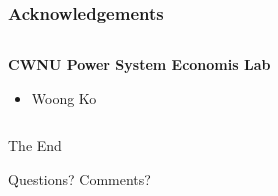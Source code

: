 \documentclass[
	11pt, %
	aspectratio=169, %
]{beamer}
\begin{document}
\begin{frame}
	\frametitle{Acknowledgements}
	
	\begin{columns}[t] %
		\begin{column}{0.45\textwidth} %
			\textbf{CWNU Power System Economis Lab}
			\begin{itemize}
				\item Woong Ko
			\end{itemize}
			
		\end{column}		
		
	\end{columns}
\end{frame}


\begin{frame}[plain] %
	\begin{center}
		{\Huge The End}
		
		\bigskip\bigskip %
		
		{\LARGE Questions? Comments?}
	\end{center}
\end{frame}

\end{document}
